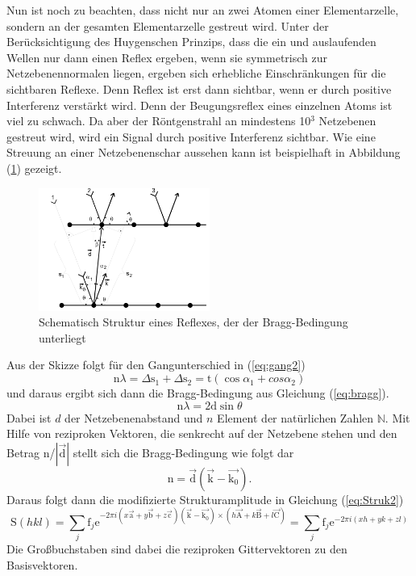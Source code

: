 Nun ist noch zu beachten, dass nicht nur an zwei Atomen einer Elementarzelle, sondern an der gesamten Elementarzelle gestreut wird. 
Unter der Berücksichtigung des Huygenschen Prinzips, dass die ein und auslaufenden Wellen nur dann einen Reflex ergeben, wenn sie symmetrisch zur Netzebenennormalen liegen, ergeben sich erhebliche Einschränkungen für die sichtbaren Reflexe.
Denn Reflex ist erst dann sichtbar, wenn er durch positive Interferenz verstärkt wird. Denn der Beugungsreflex eines einzelnen Atoms ist viel zu schwach.
Da aber der Röntgenstrahl an mindestens 10$^3$ Netzebenen gestreut wird, wird ein Signal durch positive Interferenz sichtbar.
Wie eine Streuung an einer Netzebenenschar aussehen kann ist beispielhaft in Abbildung (\ref{fig:bragg}) gezeigt.
\begin{figure}[h]
	\centering
	\includegraphics[width = 0.5\textwidth]{Abbildungen/bragg}
	\caption{Schematisch Struktur eines Reflexes, der der Bragg-Bedingung unterliegt}
	\label{fig:bragg}
\end{figure}
Aus der Skizze folgt für den Gangunterschied in (\ref{eq:gang2}) 
\begin{equation}
\text{n} \lambda = \Delta \text{s}_1+\Delta \text{s}_2 = \text{t}(\cos{\alpha_1}+cos{\alpha_2})
\label{eq:gang2}
\end{equation}
und daraus ergibt sich dann die Bragg-Bedingung aus Gleichung (\ref{eq:bragg}).
\begin{equation}
\text{n}\lambda = 2 \text{d} \sin{\theta}
\label{eq:bragg}
\end{equation}
Dabei ist $d$ der Netzebenenabstand und $n$ Element der natürlichen Zahlen $\mathbb{N}$.
Mit Hilfe von reziproken Vektoren, die senkrecht auf der Netzebene stehen und den Betrag n/$|\vec{\text{d}}|$ stellt sich die Bragg-Bedingung wie folgt dar
\begin{equation}
 \text{n} = \vec{ \text{d}}(\vec{ \text{k}}-\vec{ \text{k}_0}).
\end{equation}
Daraus folgt dann die modifizierte Strukturamplitude in Gleichung (\ref{eq:Struk2})
\begin{equation}
\text{S}(hkl) = \sum_j \text{f}_j \text{e}^{-2\pi i (x\vec{\text{a}}+y \vec{\text{b}}+ z \vec{\text{c}}) (\vec{\text{k}}-\vec{\text{k}_0})\times (h\vec{\text{A}}+k\vec{\text{B}}+ l\vec{\text{C}}) } = \sum_j \text{f}_j \text{e}^{-2\pi i (xh+y k+ z l) }
\label{eq:Struk2}
\end{equation}
Die Großbuchstaben sind dabei die reziproken Gittervektoren zu den Basisvektoren.
